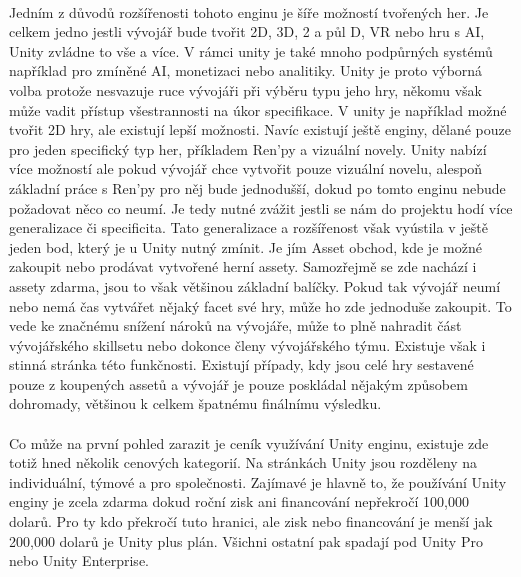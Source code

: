 \paragraph{}
	Jedním z důvodů rozšířenosti tohoto enginu je šíře možností tvořených her.
	Je celkem jedno jestli vývojář bude tvořit 2D, 3D, 2 a půl D, VR nebo hru s AI, Unity zvládne to vše a více.
	V rámci unity je také mnoho podpůrných systémů například pro zmíněné AI, monetizaci nebo analitiky.
	Unity je proto výborná volba protože nesvazuje ruce vývojáři při výběru typu jeho hry, někomu však může vadit přístup všestrannosti na úkor specifikace.
	V unity je například možné tvořit 2D hry, ale existují lepší možnosti.
	Navíc existují ještě enginy, dělané pouze pro jeden specifický typ her, příkladem Ren'py\cite{ren_py} a vizuální novely.
	Unity nabízí více možností ale pokud vývojář chce vytvořit pouze vizuální novelu, alespoň základní práce s Ren'py pro něj bude jednodušší, dokud po tomto enginu nebude požadovat něco co neumí.
	Je tedy nutné zvážit jestli se nám do projektu hodí více generalizace či specificita.
	Tato generalizace a rozšířenost však vyústila v ještě jeden bod, který je u Unity nutný zmínit.
	Je jím Asset obchod\cite{unity_asset_store}, kde je možné zakoupit nebo prodávat vytvořené herní assety.
	Samozřejmě se zde nachází i assety zdarma, jsou to však většinou základní balíčky.
	Pokud tak vývojář neumí nebo nemá čas vytvářet nějaký facet své hry, může ho zde jednoduše zakoupit.
	To vede ke značnému snížení nároků na vývojáře, může to plně nahradit část vývojářského skillsetu nebo dokonce členy vývojářského týmu.
	Existuje však i stinná stránka této funkčnosti.
	Existují případy, kdy jsou celé hry sestavené pouze z koupených assetů a vývojář je pouze poskládal nějakým způsobem dohromady, většinou k celkem špatnému finálnímu výsledku.



\paragraph{}
	Co může na první pohled zarazit je ceník využívání Unity enginu, existuje zde totiž hned několik cenových kategorií\cite{unity_pay_plan}.
	Na stránkách Unity jsou rozděleny na individuální, týmové a pro společnosti.
	Zajímavé je hlavně to, že používání Unity enginy je zcela zdarma dokud roční zisk ani financování nepřekročí 100,000 dolarů.
	Pro ty kdo překročí tuto hranici, ale zisk nebo financování je menší jak 200,000 dolarů je Unity plus plán.
	Všichni ostatní pak spadají pod  Unity Pro nebo Unity Enterprise.

